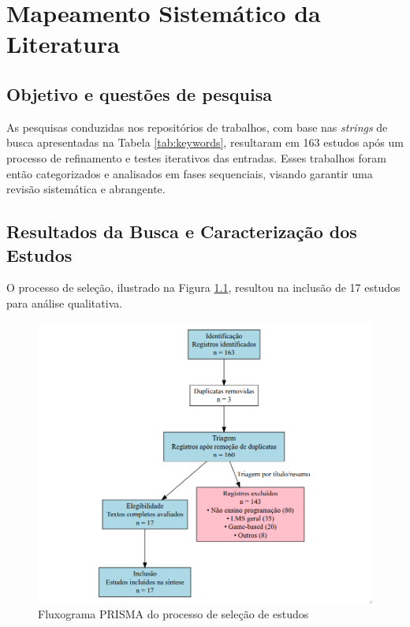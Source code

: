\chapter{Mapeamento Sistemático da Literatura}

\section{Objetivo e questões de pesquisa}

As pesquisas conduzidas nos repositórios de trabalhos, com base nas \textit{strings} de busca apresentadas na Tabela \ref{tab:keywords}, resultaram em 163 estudos após um processo de refinamento e testes iterativos das entradas. Esses trabalhos foram então categorizados e analisados em fases sequenciais, visando garantir uma revisão sistemática e abrangente.

\section{Resultados da Busca e Caracterização dos Estudos}

O processo de seleção, ilustrado na Figura \ref{fig:prisma_flowchart}, resultou na inclusão de 17 estudos para análise qualitativa.

\begin{figure}[H]
    \centering
    \includegraphics[width=1.1\linewidth]{../figuras/prisma-fluxograma.png}
    \caption{Fluxograma PRISMA do processo de seleção de estudos}
    \label{fig:prisma_flowchart}
\end{figure}

